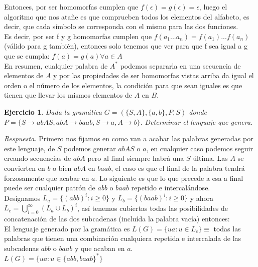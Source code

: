 \documentclass[11pt]{article}
\theoremstyle{ejercicio-style}
\newtheorem{ejer}{Ejercicio}
\begin{document}
Entonces, por ser homomorfas cumplen que $f(\epsilon) = g(\epsilon) = \epsilon$, luego el algoritmo que nos atañe es que comprueben todos los elementos del alfabeto, es decir, que cada símbolo se corresponda con el mismo para las dos funciones. \\

Es decir, por ser f y g homomorfas cumplen que $f(a_1...a_n)=f(a_1)...f(a_n)$ (válido para g también), entonces solo tenemos que ver para que f sea igual a g que se cumpla: $f(a)=g(a) \forall a \in A$ \\

En resumen, cualquier palabra de $A^*$ podemos separarla en una secuencia de elementos de $A$ y por las propiedades de ser homomorfas vistas arriba da igual el orden o el número de los elementos, la condición para que sean iguales es que tienen que llevar los mismos elementos de $A$ en $B$. \\

\begin{ejer}
	Dada la gramática $G = (\{S,A\},\{a,b\},P,S)$ donde $P = \{ S \rightarrow abAS,abA \rightarrow baab, S \rightarrow a, A \rightarrow b \}.$ Determinar el lenguaje que genera.
\end{ejer}

\emph{Respuesta.} Primero nos fijamos en como van a acabar las palabras generadas por este lenguaje, de $S$ podemos generar $abAS$ o $a$, en cualquier caso podemos seguir creando secuencias de $abA$ pero al final siempre habrá una $S$ última. Las $A$ se convierten en $b$ o bien $abA$ en $baab$, el caso es que el final de la palabra tendrá forzosamente que acabar en $a$. Lo siguiente es que lo que precede a esa a final puede ser cualquier patrón de $abb$ o $baab$ repetido e intercalándose. \\

Designamos $L_{a} = \{ (abb)^i : i\geq 0 \}$ y $L_{b} = \{ (baab)^i : i\geq 0 \} $ y ahora $L_{c} = \bigcup\limits_{i=0}^{\infty} {(L_a \cup L_b)}^i$, así tenemos cubiertas todas las posibilidades de concatenación de las dos subcadenas (incluída la palabra vacía) entonces: \\

El lenguaje generado por la gramática es $L(G) = \{ ua : u \in L_c \} \equiv$ todas las palabras que tienen una combinación cualquiera repetida e intercalada de las subcadenas $abb$ o $baab$ y que acaban en $a$. \\

$L(G) = \{ ua : u \in {\{abb,baab\}}^* \}$ \\
\end{document}
